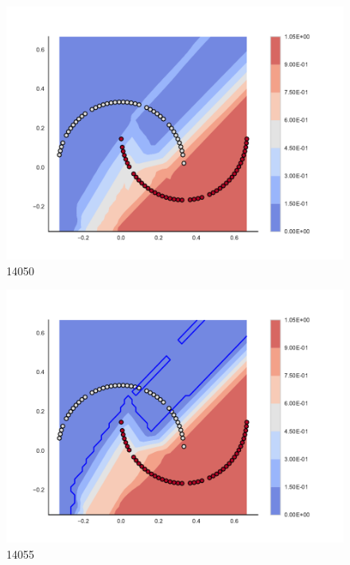 \begin{subfigure}[b]{0.09\textwidth}
    \includegraphics[clip, trim=2.35cm 1.75cm 4.5cm 0cm,width=\textwidth]{img/convergence/14050.pdf}
    \caption{14050}
    \label{fig:convergence_14050}
\end{subfigure}
%
\begin{subfigure}[b]{0.09\textwidth}
    \includegraphics[clip, trim=2.35cm 1.75cm 4.5cm 0cm,width=\textwidth]{img/convergence/14055.pdf}
    \caption{14055}
    \label{fig:convergence_14055}
\end{subfigure}
%
